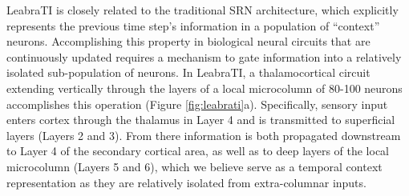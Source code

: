 \documentclass[10pt,letterpaper]{article}
\numberwithin{equation}{section}
\begin{document}
LeabraTI is closely related to the traditional SRN architecture, which explicitly represents the previous time step's information in a population of ``context'' neurons. Accomplishing this property in biological neural circuits that are continuously updated requires a mechanism to gate information into a relatively isolated sub-population of neurons. In LeabraTI, a thalamocortical circuit extending vertically through the layers of a local microcolumn of 80-100 neurons \cite{Mountcastle:1997,Douglas:2004} accomplishes this operation (Figure \ref{fig:leabrati}a). Specifically, sensory input enters cortex through the thalamus in Layer 4 and is transmitted to superficial layers (Layers 2 and 3). From there information is both propagated downstream to Layer 4 of the secondary cortical area, as well as to deep layers of the local microcolumn (Layers 5 and 6), which we believe serve as a temporal context representation as they are relatively isolated from extra-columnar inputs. 
\end{document}
